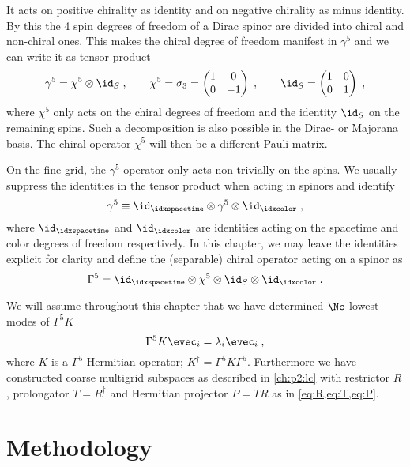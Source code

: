 It acts on positive chirality as identity and on negative chirality as minus identity.
By this the \num{4} spin degrees of freedom of a Dirac spinor are divided into chiral and non-chiral ones.
This makes the chiral degree of freedom manifest in $\gamma^5$ and we can write it as tensor product
\begin{equation}
\gamma^5 = \chi^5 \otimes \id_S \;,
\qquad
\chi^5 = 
\sigma_3 = 
\begin{pmatrix}
1 & 0 \\
0 & -1
\end{pmatrix} \;,
\qquad
\id_S = 
\begin{pmatrix}
1 & 0 \\
0 & 1
\end{pmatrix} \;,
\end{equation}
where $\chi^5$ only acts on the chiral degrees of freedom and the identity $\id_S$ on the remaining spins.
Such a decomposition is also possible in the Dirac- or Majorana basis.
The chiral operator $\chi^5$ will then be a different Pauli matrix.

On the fine grid, the $\gamma^5$ operator only acts non-trivially on the spins.
We usually suppress the identities in the tensor product when acting in spinors and identify
\begin{equation}
\gamma^5 \equiv \id_{\idxspacetime} \otimes \gamma^5 \otimes \id_{\idxcolor} \;,
\end{equation}
where $\id_{\idxspacetime}$ and $\id_{\idxcolor}$ are identities acting on the spacetime and color degrees of freedom respectively.
In this chapter, we may leave the identities explicit for clarity and define the (separable) chiral operator acting on a spinor as
\begin{equation}
\Gamma^5 = \id_{\idxspacetime} \otimes \chi^5 \otimes \id_S \otimes \id_{\idxcolor} \;.
\end{equation}

We will assume throughout this chapter that we have determined $\Nc$ lowest modes of $\Gamma^{5} K$
\begin{equation}
\Gamma^5 K \evec_i = \lambda_i \evec_i \;,
\end{equation}
where $K$ is a $\Gamma^{5}$-Hermitian operator; $K^{\dagger} = \Gamma^{5} K \Gamma^{5}$.
Furthermore we have constructed coarse multigrid subspaces as described in \cref{ch:p2:lc} with restrictor $R$, prolongator $T=R^{\dagger}$ and Hermitian projector $P = TR$ as in \cref{eq:R,eq:T,eq:P}.

\section{Methodology}

